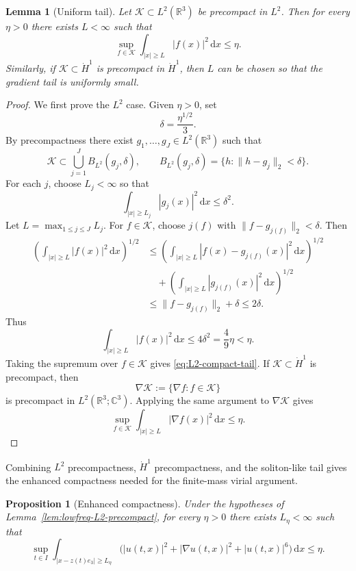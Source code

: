 \documentclass[preprint,12pt]{elsarticle}
\numberwithin{equation}{section}
\newcommand{\R}{\mathbb R}
\newcommand{\C}{\mathbb C}
\newcommand{\dd}{\,\mathrm d}
\newcommand{\na}{\nabla}
\newcommand{\ez}{e_3}
\newtheorem{proposition}[theorem]{Proposition}
\newtheorem{lemma}[theorem]{Lemma}
\theoremstyle{remark}
\begin{document}
\begin{lemma}[Uniform tail]\label{lem:compact-tail}
Let $\mathcal K\subset L^2(\R^3)$ be precompact in $L^2$.  Then for every $\eta>0$ there exists $L<\infty$ such that
\begin{equation}\label{eq:L2-compact-tail}
  \sup_{f\in\mathcal K}\int_{|x|\ge L}|f(x)|^2\dd x\le\eta.
\end{equation}
Similarly, if $\mathcal K\subset\dot H^1$ is precompact in $\dot H^1$, then $L$ can be chosen so that the gradient tail is uniformly small.
\end{lemma}

\begin{proof}
We first prove the $L^2$ case.  Given $\eta>0$, set
\[
  \delta=\frac{\eta^{1/2}}{3}.
\]
By precompactness there exist $g_1,\ldots,g_J\in L^2(\R^3)$ such that
\[
  \mathcal K\subset \bigcup_{j=1}^J B_{L^2}(g_j,\delta),
  \qquad B_{L^2}(g_j,\delta)=\{h:\|h-g_j\|_2<\delta\}.
\]
For each $j$, choose $L_j<\infty$ so that
\[
  \int_{|x|\ge L_j}|g_j(x)|^2\dd x\le\delta^2.
\]
Let $L=\max_{1\le j\le J}L_j$.  For $f\in\mathcal K$, choose $j(f)$ with $\|f-g_{j(f)}\|_2<\delta$.  Then
\begin{align*}
  \left(\int_{|x|\ge L}|f(x)|^2\dd x\right)^{1/2}
  &\le \left(\int_{|x|\ge L}|f(x)-g_{j(f)}(x)|^2\dd x\right)^{1/2} \\
  &\quad +\left(\int_{|x|\ge L}|g_{j(f)}(x)|^2\dd x\right)^{1/2} \\
  &\le \|f-g_{j(f)}\|_2+\delta\le2\delta.
\end{align*}
Thus
\[
  \int_{|x|\ge L}|f(x)|^2\dd x\le4\delta^2=\frac49\eta<\eta.
\]
Taking the supremum over $f\in\mathcal K$ gives \eqref{eq:L2-compact-tail}.  If $\mathcal K\subset\dot H^1$ is precompact, then
\[
  \nabla\mathcal K:=\{\na f:f\in\mathcal K\}
\]
is precompact in $L^2(\R^3;\C^3)$.  Applying the same argument to $\nabla\mathcal K$ gives
\[
  \sup_{f\in\mathcal K}\int_{|x|\ge L}|\na f(x)|^2\dd x\le\eta.
\]
\end{proof}

Combining $L^2$ precompactness, $\dot H^1$ precompactness, and the soliton-like tail gives the enhanced compactness needed for the finite-mass virial argument.

\begin{proposition}[Enhanced compactness]\label{prop:enhanced-tightness}
Under the hypotheses of Lemma~\ref{lem:lowfreq-L2-precompact}, for every $\eta>0$ there exists $L_\eta<\infty$ such that
\begin{equation}\label{eq:enhanced-tightness}
  \sup_{t\in I}\int_{|x-z(t)\ez|\ge L_\eta}
  \bigl(|u(t,x)|^2+|\na u(t,x)|^2+|u(t,x)|^6\bigr)\dd x\le\eta.
\end{equation}
\end{proposition}
\end{document}
